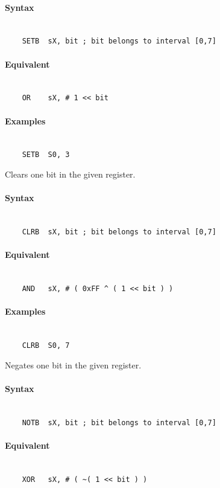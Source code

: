     \paragraph{Syntax}
        ~\\
        \verb'    SETB  sX, bit ; bit belongs to interval [0,7]'

    \paragraph{Equivalent}
        ~\\
        \verb'    OR    sX, # 1 << bit'

    \paragraph{Examples}
        ~\\
        \verb'    SETB  S0, 3'

\clearpage
{}
    Clears one bit in the given register.

    \paragraph{Syntax}
        ~\\
        \verb'    CLRB  sX, bit ; bit belongs to interval [0,7]'

    \paragraph{Equivalent}
        ~\\
        \verb'    AND   sX, # ( 0xFF ^ ( 1 << bit ) )'

    \paragraph{Examples}
        ~\\
        \verb'    CLRB  S0, 7'

    Negates one bit in the given register.

    \paragraph{Syntax}
        ~\\
        \verb'    NOTB  sX, bit ; bit belongs to interval [0,7]'

    \paragraph{Equivalent}
        ~\\
        \verb'    XOR   sX, # ( ~( 1 << bit ) )'

